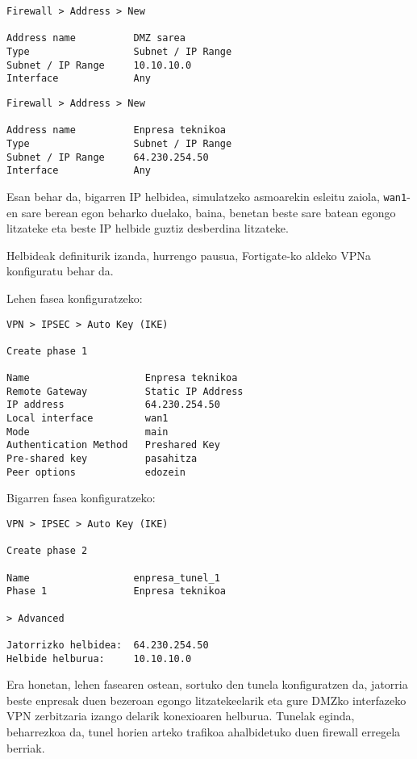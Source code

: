 \begin{verbatim}
Firewall > Address > New

Address name          DMZ sarea
Type                  Subnet / IP Range
Subnet / IP Range     10.10.10.0
Interface             Any
\end{verbatim}

\begin{verbatim}
Firewall > Address > New

Address name          Enpresa teknikoa
Type                  Subnet / IP Range
Subnet / IP Range     64.230.254.50
Interface             Any
\end{verbatim}

Esan behar da, bigarren IP helbidea, simulatzeko asmoarekin esleitu zaiola, \texttt{wan1}-en sare berean egon beharko duelako, baina, benetan beste sare batean egongo litzateke eta beste IP helbide guztiz desberdina litzateke.

Helbideak definiturik izanda, hurrengo pausua, Fortigate-ko aldeko VPNa konfiguratu behar da.

Lehen fasea konfiguratzeko:

\begin{verbatim}
VPN > IPSEC > Auto Key (IKE) 

Create phase 1

Name                    Enpresa teknikoa
Remote Gateway          Static IP Address
IP address              64.230.254.50
Local interface         wan1
Mode                    main
Authentication Method   Preshared Key
Pre-shared key          pasahitza
Peer options            edozein
\end{verbatim}

Bigarren fasea konfiguratzeko:

\begin{verbatim}
VPN > IPSEC > Auto Key (IKE) 

Create phase 2

Name                  enpresa_tunel_1
Phase 1               Enpresa teknikoa

> Advanced

Jatorrizko helbidea:  64.230.254.50
Helbide helburua:     10.10.10.0
\end{verbatim}

Era honetan, lehen fasearen ostean, sortuko den tunela konfiguratzen da, jatorria beste enpresak duen bezeroan egongo litzatekeelarik eta gure DMZko interfazeko VPN zerbitzaria izango delarik konexioaren helburua. Tunelak eginda, beharrezkoa da, tunel horien arteko trafikoa ahalbidetuko duen firewall erregela berriak.

